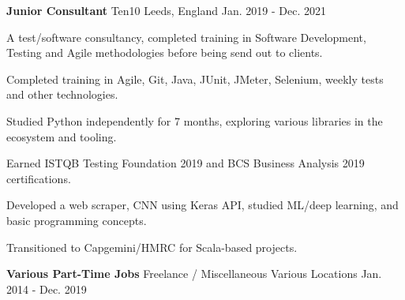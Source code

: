 \begin{cventries}
    {\textbf{Junior Consultant}} 
    {Ten10} 
    {Leeds, England} 
    {Jan. 2019 - Dec. 2021}
    {
      \begin{sloppypar}  
      \begin{cvitems}
        \item {A test/software consultancy, completed training in Software Development, Testing and Agile methodologies before being send out to clients.}
        \item {Completed training in Agile, Git, Java, JUnit, JMeter, Selenium, weekly tests and other technologies.}
        \item {Studied Python independently for 7 months, exploring various libraries in the ecosystem and tooling.}
        \item {Earned ISTQB Testing Foundation 2019 and BCS Business Analysis 2019 certifications.}
        \item {Developed a web scraper, CNN using Keras API, studied ML/deep learning, and basic programming concepts.}
        \item {Transitioned to Capgemini/HMRC for Scala-based projects.}
      \end{cvitems}
      \end{sloppypar}
    }    

\cventry
    {\textbf{Various Part-Time Jobs}} 
    {Freelance / Miscellaneous} 
    {Various Locations} 
    {Jan. 2014 - Dec. 2019}
    {}      

\end{cventries}
